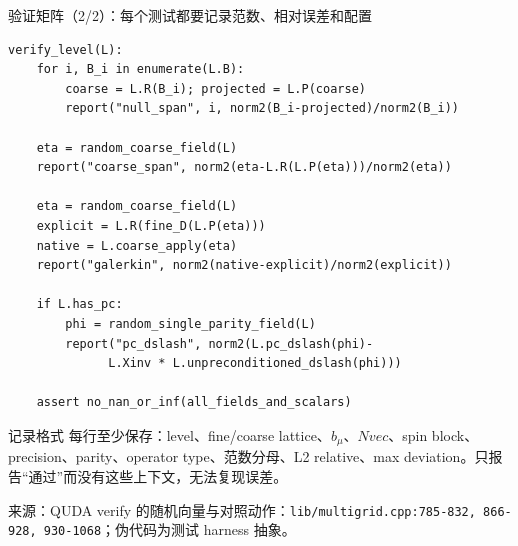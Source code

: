 \documentclass[UTF8,aspectratio=169,11pt]{ctexbeamer}
\newcommand{\source}[1]{\vspace{0.05em}\par{\raggedright\scriptsize\color{muted}来源：#1\par}}
\newcommand{\codepath}[1]{\nolinkurl{#1}}
\begin{document}
\begin{frame}[fragile,t]{验证矩阵（2/2）：每个测试都要记录范数、相对误差和配置}
  \begin{lstlisting}[firstnumber=1]
verify_level(L):
    for i, B_i in enumerate(L.B):
        coarse = L.R(B_i); projected = L.P(coarse)
        report("null_span", i, norm2(B_i-projected)/norm2(B_i))

    eta = random_coarse_field(L)
    report("coarse_span", norm2(eta-L.R(L.P(eta)))/norm2(eta))

    eta = random_coarse_field(L)
    explicit = L.R(fine_D(L.P(eta)))
    native = L.coarse_apply(eta)
    report("galerkin", norm2(native-explicit)/norm2(explicit))

    if L.has_pc:
        phi = random_single_parity_field(L)
        report("pc_dslash", norm2(L.pc_dslash(phi)-
              L.Xinv * L.unpreconditioned_dslash(phi)))

    assert no_nan_or_inf(all_fields_and_scalars)
  \end{lstlisting}
  \vspace{0.07cm}
  \begin{block}{记录格式}
    每行至少保存：level、fine/coarse lattice、\(b_\mu\)、\(Nvec\)、spin block、precision、parity、operator type、范数分母、L2 relative、max deviation。只报告“通过”而没有这些上下文，无法复现误差。
  \end{block}
  \source{QUDA verify 的随机向量与对照动作：\codepath{lib/multigrid.cpp:785-832, 866-928, 930-1068}；伪代码为测试 harness 抽象。}
\end{frame}
\end{document}
